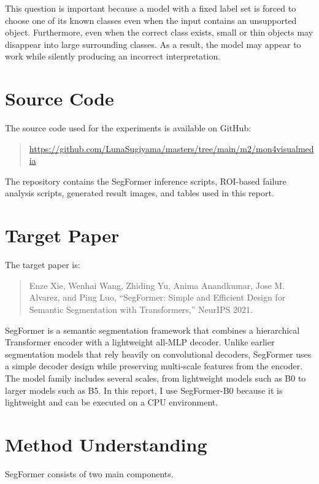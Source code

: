 \documentclass[10pt,a4paper]{article}
\begin{document}
This question is important because a model with a fixed label set is forced to choose one of its known classes even when the input contains an unsupported object.
Furthermore, even when the correct class exists, small or thin objects may disappear into large surrounding classes.
As a result, the model may appear to work while silently producing an incorrect interpretation.

\section{Source Code}

The source code used for the experiments is available on GitHub:

\begin{quote}
\url{https://github.com/LunaSugiyama/masters/tree/main/m2/mon4visualmedia}
\end{quote}

The repository contains the SegFormer inference scripts, ROI-based failure analysis scripts, generated result images, and tables used in this report.

\section{Target Paper}

The target paper is:

\begin{quote}
Enze Xie, Wenhai Wang, Zhiding Yu, Anima Anandkumar, Jose M. Alvarez, and Ping Luo, 
``SegFormer: Simple and Efficient Design for Semantic Segmentation with Transformers,'' 
NeurIPS 2021.
\end{quote}

SegFormer is a semantic segmentation framework that combines a hierarchical Transformer encoder with a lightweight all-MLP decoder.
Unlike earlier segmentation models that rely heavily on convolutional decoders, SegFormer uses a simple decoder design while preserving multi-scale features from the encoder.
The model family includes several scales, from lightweight models such as B0 to larger models such as B5.
In this report, I use SegFormer-B0 because it is lightweight and can be executed on a CPU environment.

\section{Method Understanding}

SegFormer consists of two main components.
\end{document}
